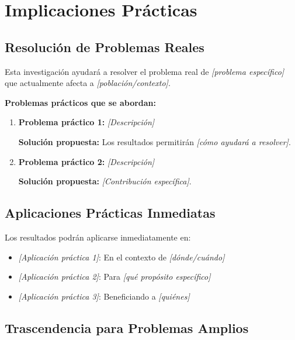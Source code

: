 \section{Implicaciones Prácticas}
\label{sec:implicaciones_practicas}


\subsection{Resolución de Problemas Reales}

Esta investigación ayudará a resolver el problema real de \textit{[problema específico]} que actualmente afecta a \textit{[población/contexto]}.

\textbf{Problemas prácticos que se abordan:}

\begin{enumerate}
    \item \textbf{Problema práctico 1:} \textit{[Descripción]}
    
    \textbf{Solución propuesta:} Los resultados permitirán \textit{[cómo ayudará a resolver]}.
    
    \item \textbf{Problema práctico 2:} \textit{[Descripción]}
    
    \textbf{Solución propuesta:} \textit{[Contribución específica]}.
\end{enumerate}

\subsection{Aplicaciones Prácticas Inmediatas}

Los resultados podrán aplicarse inmediatamente en:

\begin{itemize}
    \item \textit{[Aplicación práctica 1]}: En el contexto de \textit{[dónde/cuándo]}
    \item \textit{[Aplicación práctica 2]}: Para \textit{[qué propósito específico]}
    \item \textit{[Aplicación práctica 3]}: Beneficiando a \textit{[quiénes]}
\end{itemize}

\subsection{Trascendencia para Problemas Amplios}

